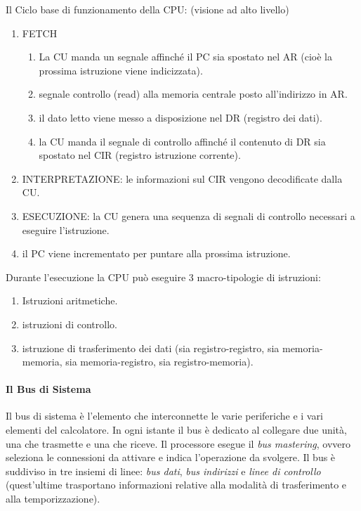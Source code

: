 \documentclass[
]{article}
\begin{document}
Il Ciclo base di funzionamento della CPU: (visione ad alto livello)

\begin{enumerate}
\def\labelenumi{\arabic{enumi}.}
\item
  FETCH

  \begin{enumerate}
  \def\labelenumii{\arabic{enumii}.}
  \item
    La CU manda un segnale affinché il PC sia spostato nel AR (cioè la
    prossima istruzione viene indicizzata).
  \item
    segnale controllo (read) alla memoria centrale posto all'indirizzo
    in AR.
  \item
    il dato letto viene messo a disposizione nel DR (registro dei dati).
  \item
    la CU manda il segnale di controllo affinché il contenuto di DR sia
    spostato nel CIR (registro istruzione corrente).
  \end{enumerate}
\item
  INTERPRETAZIONE: le informazioni sul CIR vengono decodificate dalla
  CU.
\item
  ESECUZIONE: la CU genera una sequenza di segnali di controllo
  necessari a eseguire l'istruzione.
\item
  il PC viene incrementato per puntare alla prossima istruzione.
\end{enumerate}

Durante l'esecuzione la CPU può eseguire 3 macro-tipologie di
istruzioni:

\begin{enumerate}
\def\labelenumi{\arabic{enumi}.}
\item
  Istruzioni aritmetiche.
\item
  istruzioni di controllo.
\item
  istruzione di trasferimento dei dati (sia registro-registro, sia
  memoria-memoria, sia memoria-registro, sia registro-memoria).
\end{enumerate}

\hypertarget{header-n238}{%
\paragraph{Il Bus di Sistema}\label{header-n238}}

Il bus di sistema è l'elemento che interconnette le varie periferiche e
i vari elementi del calcolatore. In ogni istante il bus è dedicato al
collegare due unità, una che trasmette e una che riceve. Il processore
esegue il \emph{bus mastering}, ovvero seleziona le connessioni da
attivare e indica l'operazione da svolgere. Il bus è suddiviso in tre
insiemi di linee: \emph{bus dati}, \emph{bus indirizzi} e \emph{linee di
controllo} (quest'ultime trasportano informazioni relative alla modalità
di trasferimento e alla temporizzazione).
\end{document}
